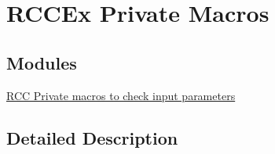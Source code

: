 \hypertarget{group___r_c_c_ex___private___macros}{}\section{R\+C\+C\+Ex Private Macros}
\label{group___r_c_c_ex___private___macros}
\subsection*{Modules}
\begin{DoxyCompactItemize}
\item 
\hyperlink{group___r_c_c_ex___i_s___r_c_c___definitions}{R\+C\+C Private macros to check input parameters}
\end{DoxyCompactItemize}


\subsection{Detailed Description}

